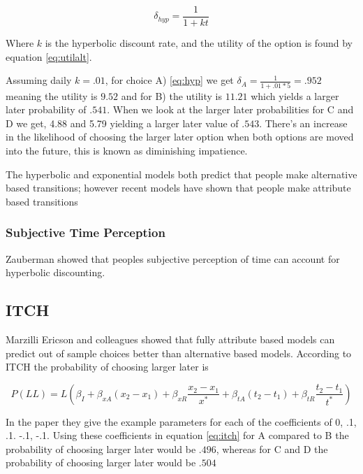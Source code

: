 \documentclass[]{article}
\begin{document}
\begin{equation}\label{eq:hyp}
\delta_{hyp} = \frac{1}{1+kt}
\end{equation}

Where $k$ is the hyperbolic discount rate, and the utility of the option is found by equation \ref{eq:utilalt}.

Assuming daily $k = .01$, for choice A) \ref{eq:hyp} we get $\delta_A = \frac{1}{1+.01*5} = .952$ meaning the utility is $9.52$ and for B) the utility is $11.21$ which yields a larger later probability of $.541$. When we look at the larger later probabilities for C and D we get, 4.88 and  5.79 yielding a larger later value of $.543$. There's an increase in the likelihood of choosing the larger later option when both options are moved into the future, this is known as diminishing impatience. 

The hyperbolic and exponential models both predict that people make alternative based transitions; however recent models have shown that people make attribute based transitions



\subsubsection{Subjective Time Perception}

Zauberman showed that peoples subjective perception of time can account for hyperbolic discounting. 

\subsection{ITCH}
\label{ITCH}

Marzilli Ericson and colleagues showed that fully attribute based models can predict out of sample choices better than alternative based models. 
According to ITCH the probability of choosing larger later is

\begin{equation}\label{eq:itch}
	P(LL) = L \left(\beta_I + \beta_{xA}(x_2 - x_1) + \beta_{xR} \frac{x_2 - x_1}{x^*} + \beta_{tA}(t_2 - t_1) + \beta_{tR} \frac{t_2 - t_1}{t^*}\right)
\end{equation}

In the paper they give the example parameters for each of the coefficients of 0, .1, .1. -.1, -.1. Using these coefficients in equation \ref{eq:itch} for A compared to B the probability of choosing larger later would be $.496$, whereas for C and D the probability of choosing larger later would be $.504$
\end{document}
